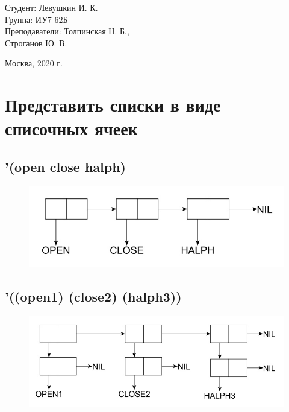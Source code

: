 \documentclass[a4paper,12pt]{article}
\begin{document}
	\vspace*{15mm} 	
	
	\large
	\begin{flushright}
		Студент: Левушкин И. К. \\
		Группа: ИУ7-62Б \\
		Преподаватели: Толпинская Н. Б., \\ Строганов Ю. В. \\
	\end{flushright}
	
	\vspace*{30mm}
	\begin{center}
		Москва, 2020 г.  
	\end{center}
	\thispagestyle{empty}
	
	
	\newpage
	
	\section{Представить списки в виде списочных ячеек}
	
	\subsection{'(open close halph)}
	
	\begin{figure}[h!]
		\begin{center}
			{\includegraphics[scale = 0.4]{first.jpg}}
			\label{ris:1}
		\end{center}
	\end{figure}
	
	\subsection{'((open1) (close2) (halph3))}
	
	\begin{figure}[h!]
		\begin{center}
			{\includegraphics[scale = 0.4]{second.jpg}}
			\label{ris:2}
		\end{center}
	\end{figure}
	
\end{document}
